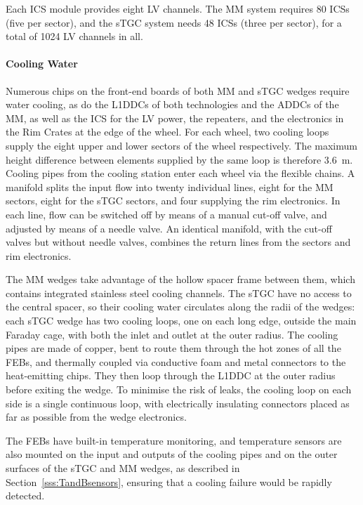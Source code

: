 \documentclass[cernpreprint, atlasdraft=false, UKenglish,british,orcidlogo, texmf, orcidlogo]{atlasdoc}
\begin{document}
Each \gls{ICS} module provides eight \gls{LV} channels.
The \gls{MM} system requires \num{80} \glspl{ICS} (five per sector),
and the \gls{sTGC} system needs \num{48} \glspl{ICS} (three per sector),
for a total of \num{1024} \gls{LV} channels in all.
 
\paragraph{Cooling Water}
Numerous chips on the front-end boards of both \gls{MM} and \gls{sTGC} wedges require water cooling, as do the \glspl{L1DDC} of both technologies and the \glspl{ADDC} of the \gls{MM}, as well as the \gls{ICS} for the \gls{LV} power,
the repeaters, 
and the electronics in the Rim Crates at the edge of the wheel. 
For each wheel, two cooling loops supply the eight upper and lower sectors of the wheel respectively.
The maximum height difference between elements supplied by the same loop is therefore \SI{3.6}{\m}.
Cooling pipes from the cooling station enter each wheel via the flexible chains.
A manifold splits the input flow into twenty individual lines, eight for the  \gls{MM} sectors, eight for the \gls{sTGC} sectors, and four supplying the rim electronics.
In each line, flow can be switched off by means of a manual cut-off valve, and adjusted by means of a needle valve.
An identical manifold, with the cut-off valves but without needle valves, combines the return lines from the sectors and rim electronics.
 
 
The \gls{MM} wedges take advantage of the hollow spacer frame between them, which contains integrated stainless steel cooling channels.
The \gls{sTGC} have no access to the central spacer, so their cooling water circulates along the radii of the wedges: each \gls{sTGC} wedge has two cooling loops, one on each long edge, outside the main Faraday cage, with both the inlet and outlet at the outer radius. The cooling pipes are made of copper, bent to route them through the hot zones of all the \glspl{FEB}, and thermally coupled via conductive foam and metal connectors to the heat-emitting chips.  They then loop through the \gls{L1DDC} at the outer radius before exiting the wedge. To minimise the risk of leaks, the cooling loop on each side is a single continuous loop, with electrically insulating connectors placed as far as possible from the wedge electronics.
 
The \glspl{FEB} have built-in temperature monitoring, and temperature sensors are also mounted on the input and outputs of the cooling pipes and on the outer surfaces of the \gls{sTGC} and \gls{MM} wedges, as described in Section~\ref{sss:TandBsensors}, ensuring that a cooling failure would be rapidly detected.
 
\end{document}
